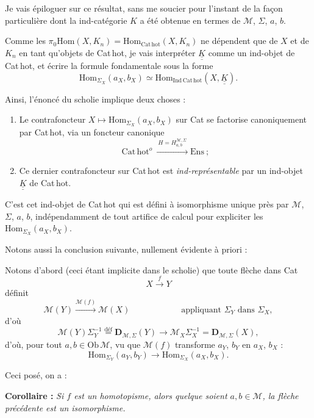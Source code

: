 \documentclass[11pt]{article}
\newcommand{\printedpage}[1]{\marginpar{\footnotesize p.~#1}}
\newcommand{\msp}[1]{\marginpar{\footnotesize [#1]}}
\newcommand{\Hom}{\mathrm{Hom}}
\newcommand{\cM}{\mathcal{M}}
\newcommand{\KK}{\underline{\underline{K}}}
\newcommand{\dfeq}{\overset{\text{déf}}{=}}
\newcommand{\Cathot}{\mathrm{Cat\,hot}}
\begin{document}
\printedpage{21}

\msp{page 34}
Je vais épiloguer sur ce résultat, sans me soucier pour l'instant de la façon particulière dont la ind-catégorie $K$ a été obtenue en termes de $\cM$, $\Sigma$, $a$, $b$.

Comme les $\pi_0\Hom(X,K_n)=\mathrm{Hom}_{\Cathot}(X,K_n)$ ne dépendent que de $X$ et de $K_n$ en tant qu'objets de Cat\,hot, je vais interpréter $\KK$ comme un ind-objet de Cat\,hot, et écrire la formule fondamentale sous la forme
\[
\mathrm{Hom}_{\Sigma_X}(a_X,b_X)\simeq\mathrm{Hom}_{\mathrm{Ind\,Cat\,hot}}(X,\KK).
\]

Ainsi, l'énoncé du scholie implique deux choses :

\begin{enumerate}
\item[a)] Le contrafoncteur $X\longmapsto\mathrm{Hom}_{\Sigma_X}(a_X,b_X)$ sur Cat se factorise canoniquement par Cat\,hot, via un foncteur canonique
\[
\Cathot^{o}\ \xrightarrow{\ H=H^{\cM,\Sigma}_{a,b}\ }\mathrm{Ens}\ ;
\]
\item[b)] Ce dernier contrafoncteur sur Cat\,hot est \textit{ind-représentable} par un ind-objet $\KK$ de Cat\,hot.
\end{enumerate}

C'est cet ind-objet de Cat\,hot qui est défini à isomorphisme unique près par $\cM$, $\Sigma$, $a$, $b$, indépendamment de tout artifice de calcul pour expliciter les $\mathrm{Hom}_{\Sigma_X}(a_X,b_X)$.

Notons aussi la conclusion suivante, nullement évidente à priori :

\msp{page 35}
Notons d'abord (ceci étant implicite dans le scholie) que toute flèche dans Cat
\[
X\xrightarrow{\ f\ }Y
\]
définit
\[
\cM(Y)\xrightarrow{\cM(f)}\cM(X) \qquad\qquad\qquad \text{appliquant } \Sigma_Y \text{ dans } \Sigma_X,
\]
d'où
\[
\cM(Y)\Sigma_Y^{-1}\dfeq\mathbf{D}_{\cM,\Sigma}(Y)\longrightarrow\cM_X\Sigma_X^{-1}=\mathbf{D}_{\cM,\Sigma}(X),
\]
 d'où, pour tout $a,b\in\mathrm{Ob}\,\cM$, vu que $\cM(f)$ transforme $a_Y$, $b_Y$ en $a_X$, $b_X$ :
\[
\boxed{\mathrm{Hom}_{\Sigma_Y}(a_Y,b_Y)\longrightarrow\mathrm{Hom}_{\Sigma_X}(a_X,b_X).}
\]

Ceci posé, on a :

\textbf{Corollaire :} \textit{Si $f$ est un homotopisme, alors quelque soient $a,b\in\cM$, la flèche précédente est un isomorphisme.} %
\end{document}

